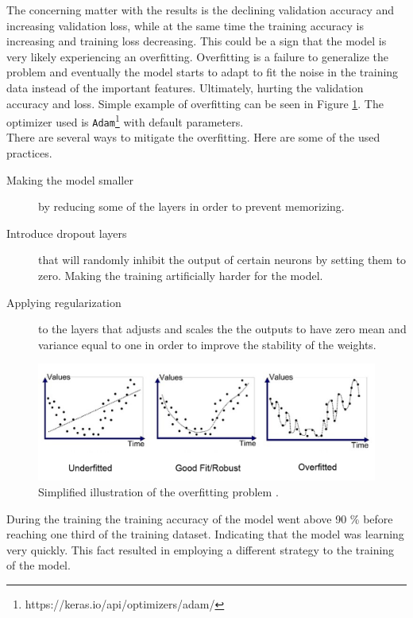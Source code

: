 \documentclass[thesis=M,english]{FITthesis}[2019/03/06]
\begin{document}
\begin{table}[ht!]
\begin{tabular}{|l|l|l|l|l|}
\end{tabular}
\label{table:training_alex}
\end{table}


The concerning matter with the results is the declining validation accuracy and increasing validation loss, while at the same time the training accuracy is increasing and training loss decreasing. This could be a sign that the model is very likely experiencing an overfitting. Overfitting is a failure to generalize the problem and eventually the model starts to adapt to fit the noise in the training data instead of the important features. Ultimately, hurting the validation accuracy and loss. Simple example of overfitting can be seen in Figure \ref{label:overfitting}. The optimizer used is \texttt{Adam}\footnote{https://keras.io/api/optimizers/adam/} with default parameters.\\



There are several ways to mitigate the overfitting. Here are some of the used practices.

\begin{description}
    \item [Making the model smaller] by reducing some of the layers in order to prevent memorizing.
    \item [Introduce dropout layers] that will randomly inhibit the output of certain neurons by setting them to zero. Making the training artificially harder for the model.
    \item [Applying regularization] to the layers that adjusts and scales the the outputs to have zero mean and variance equal to one in order to improve the stability of the weights.
\end{description}
    
\begin{figure}[ht!]
	\centering
	\includegraphics[width=\textwidth]{imgs/overfitting.png}
	\caption{Simplified illustration of the overfitting problem \cite{cit:overfitting}.}
	\label{label:overfitting}
\end{figure}
During the training the training accuracy of the model went above 90 \% before reaching one third of the training dataset. Indicating that the model was learning very quickly. This fact resulted in employing a different strategy to the training of the model.\\
\end{document}

